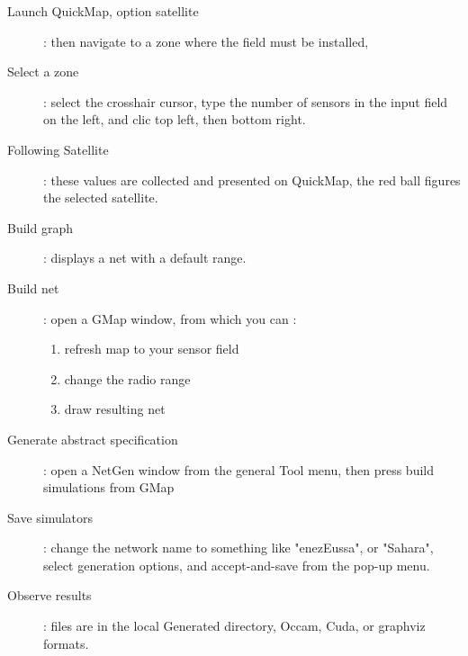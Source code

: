 \begin{description}
\item [Launch QuickMap, option satellite] : then navigate to a zone where the field must be installed,
\item [Select a zone ]: select the crosshair cursor, type the number of sensors in the input field on the left, and clic top left, then bottom right.
\item [Following Satellite ]: these values are collected and presented on QuickMap, the red ball figures the selected satellite.
\item [Build graph ]:  displays a net with a default range.
\item [Build net ]:  open a GMap window, from which you can :
\begin{enumerate}
\item refresh map to your sensor field
\item change the radio range
\item draw resulting net
\end{enumerate}
\item [Generate abstract specification ]: open a NetGen window from the general Tool menu, then press build simulations from GMap
\item [Save simulators ]: change the network name to something like "enezEussa", or "Sahara", select generation options, and accept-and-save from the pop-up menu.
\item [Observe results ]:  files are in the local Generated directory, Occam, Cuda, or graphviz formats.
\end{description}

